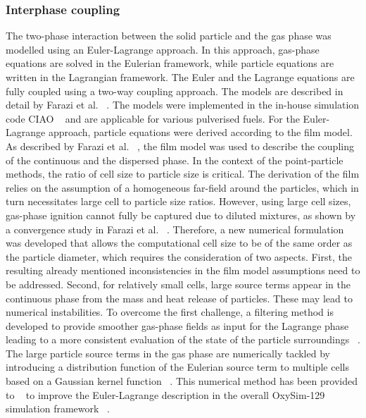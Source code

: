 \begin{btUnit}
\subsubsection{Interphase coupling} 
The two-phase interaction between the solid particle and the gas phase was modelled using an Euler-Lagrange approach. In this approach, gas-phase equations are solved in the Eulerian framework, while particle equations are written in the Lagrangian framework. The Euler and the Lagrange equations are fully coupled using a two-way coupling approach. The models are described in detail by Farazi et al. ~\cite{Farazi2019a, Farazi2019b}. The models were implemented in the in-house simulation code CIAO ~\cite{Trisjono2016} and are applicable for various pulverised fuels. For the Euler-Lagrange approach, particle equations were derived according to the film model. As described by Farazi et al. ~\cite{Farazi2017b}, the film model was used to describe the coupling of the continuous and the dispersed phase. In the context of the point-particle methods, the ratio of cell size to particle size is critical. The derivation of the film relies on the assumption of a homogeneous far-field around the particles, which in turn necessitates large cell to particle size ratios. However, using large cell sizes, gas-phase ignition cannot fully be captured due to diluted mixtures, as shown by a convergence study in Farazi et al. ~\cite{Farazi2019a, Farazi2019b}. Therefore, a new numerical formulation was developed that allows the computational cell size to be of the same order as the particle diameter, which requires the consideration of two aspects. First, the resulting already mentioned inconsistencies in the film model assumptions need to be addressed. Second, for relatively small cells, large source terms appear in the continuous phase from the mass and heat release of particles. These may lead to numerical instabilities. To overcome the first challenge, a filtering method is developed to provide smoother gas-phase fields as input for the Lagrange phase leading to a more consistent evaluation of the state of the particle surroundings ~\cite{Farazi2019b}. The large particle source terms in the gas phase are numerically tackled by introducing a distribution function of the Eulerian source term to multiple cells based on a Gaussian kernel function ~\cite{Farazi2019b}. This numerical method has been provided to ~ to improve the Euler-Lagrange description in the overall OxySim-129 simulation framework ~\cite{Nicolai2021}.



\end{btUnit}
